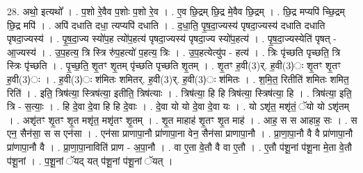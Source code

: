 \documentclass[17pt]{extarticle}
\begin{document}
28. अथो॒ इत्यथो᳚ । . प॒शो रे॒वैव प॒शोः प॒शो रे॒व । . ए॒व छि॒द्रम् छि॒द्र मे॒वैव छि॒द्रम् । . छि॒द्र मप्यपि॑ च्छि॒द्रम् छि॒द्र मपि॑ । . अपि॑ दधाति दधा॒ त्यप्यपि॑ दधाति । . द॒धा॒ति॒ पृ॒ष॒दा॒ज्यस्य॑ पृषदा॒ज्यस्य॑ दधाति दधाति पृषदा॒ज्यस्य॑ । . पृ॒ष॒दा॒ज्य स्यो॑प॒ह त्यो॑प॒हत्य॑ पृषदा॒ज्यस्य॑ पृषदा॒ज्य स्यो॑प॒हत्य॑ । . पृ॒ष॒दा॒ज्यस्येति॑ पृषत् - आ॒ज्यस्य॑ । . उ॒प॒हत्य॒ त्रि स्त्रि रु॑प॒हत्यो॑ प॒हत्य॒ त्रिः । . उ॒प॒हत्येत्यु॑प - हत्य॑ । . त्रिः पृ॑च्छति पृच्छति॒ त्रि स्त्रिः पृ॑च्छति । . पृ॒च्छ॒ति॒ शृ॒तꣳ शृ॒तम् पृ॑च्छति पृच्छति शृ॒तम् । . शृ॒तꣳ ह॒वी(3)र्. ह॒वी(3)ः शृ॒तꣳ शृ॒तꣳ ह॒वी(3)ः । . ह॒वी(3)ः श॑मितः शमितर्. ह॒वी(3)र्. ह॒वी(3)ः श॑मितः । . श॒मि॒त॒ रितीति॑ शमितः शमित॒ रिति॑ । . इति॒ त्रिष॑त्या॒ स्त्रिष॑त्या॒ इतीति॒ त्रिष॑त्याः । . त्रिष॑त्या॒ हि हि त्रिष॑त्या॒ स्त्रिष॑त्या॒ हि । . त्रिष॑त्या॒ इति॒ त्रि - स॒त्याः॒ । . हि दे॒वा दे॒वा हि हि दे॒वाः । . दे॒वा यो यो दे॒वा दे॒वा यः । . यो ऽशृ॑त॒ मशृ॑तं॒ ॅयो यो ऽशृ॑तम् । . अशृ॑तꣳ शृ॒तꣳ शृ॒त मशृ॑त॒ मशृ॑तꣳ शृ॒तम् । . शृ॒त माहाह॑ शृ॒तꣳ शृ॒त माह॑ । . आह॒ स स आहाह॒ सः । . स एन॒ सैन॑सा॒ स स एन॑सा । . एन॑सा प्राणापा॒नौ प्रा॑णापा॒ना वेन॒ सैन॑सा प्राणापा॒नौ । . प्रा॒णा॒पा॒नौ वै वै प्रा॑णापा॒नौ प्रा॑णापा॒नौ वै । . प्रा॒णा॒पा॒नाविति॑ प्राण - अ॒पा॒नौ । . वा ए॒ता वे॒तौ वै वा ए॒तौ । . ए॒तौ प॑शू॒नां प॑शू॒ना मे॒ता वे॒तौ प॑शू॒नां । . प॒शू॒नां ॅयद् यत् प॑शू॒नां प॑शू॒नां ॅयत् । \newline
\end{document}
